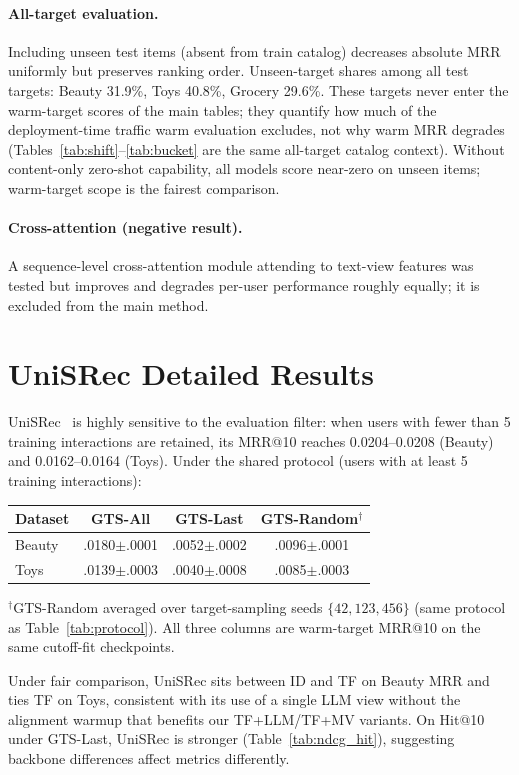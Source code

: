 \documentclass[sigconf,natbib=true,anonymous]{acmart}
\newcommand{\tfllm}{\textsc{TF+LLM}\xspace}
\newcommand{\tfmv}{\textsc{TF+MV}\xspace}
\begin{document}
\paragraph{All-target evaluation.}
Including unseen test items (absent from train catalog) decreases absolute MRR uniformly but preserves ranking order.
Unseen-target shares among all test targets: Beauty 31.9\%, Toys 40.8\%, Grocery 29.6\%.
These targets never enter the warm-target scores of the main tables; they quantify how much of the deployment-time traffic warm evaluation excludes, not why warm MRR degrades (Tables~\ref{tab:shift}--\ref{tab:bucket} are the same all-target catalog context).
Without content-only zero-shot capability, all models score near-zero on unseen items; warm-target scope is the fairest comparison.

\paragraph{Cross-attention (negative result).}
\label{app:cross}
A sequence-level cross-attention module attending to text-view features was tested but improves and degrades per-user performance roughly equally; it is excluded from the main method.

\section{UniSRec Detailed Results}
\label{app:unisrec}

UniSRec~\cite{hou2022unisrec} is highly sensitive to the evaluation filter: when users with fewer than 5 training interactions are retained, its MRR@10 reaches 0.0204--0.0208 (Beauty) and 0.0162--0.0164 (Toys).
Under the shared protocol (users with at least 5 training interactions):

\begin{table}[h]
\centering
\small
\begin{tabular}{@{}lccc@{}}
\toprule
Dataset & GTS-All & GTS-Last & GTS-Random$^\dagger$ \\
\midrule
Beauty & .0180$\pm$.0001 & .0052$\pm$.0002 & .0096$\pm$.0001 \\
Toys   & .0139$\pm$.0003 & .0040$\pm$.0008 & .0085$\pm$.0003 \\
\bottomrule
\end{tabular}
\end{table}

\noindent$^\dagger$GTS-Random averaged over target-sampling seeds $\{42,123,456\}$ (same protocol as Table~\ref{tab:protocol}).
All three columns are warm-target MRR@10 on the same cutoff-fit checkpoints.

Under fair comparison, UniSRec sits between ID and TF on Beauty MRR and ties TF on Toys, consistent with its use of a single LLM view without the alignment warmup that benefits our \tfllm/\tfmv variants.
On Hit@10 under GTS-Last, UniSRec is stronger (Table~\ref{tab:ndcg_hit}), suggesting backbone differences affect metrics differently.



\end{document}
